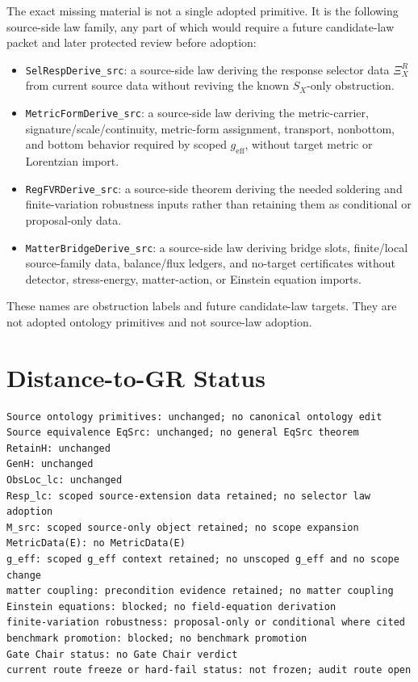 \documentclass[11pt]{article}
\newcommand{\geff}{g_{\mathrm{eff}}}
\begin{document}
The exact missing material is not a single adopted primitive. It is the
following source-side law family, any part of which would require a future
candidate-law packet and later protected review before adoption:

\begin{itemize}[leftmargin=*]
\item \texttt{SelRespDerive\_src}: a source-side law deriving the response
selector data \(\Xi_X^R\) from current source data without reviving the
known \(S_X\)-only obstruction.
\item \texttt{MetricFormDerive\_src}: a source-side law deriving the
metric-carrier, signature/scale/continuity, metric-form assignment, transport,
nonbottom, and bottom behavior required by scoped \(\geff\), without target
metric or Lorentzian import.
\item \texttt{RegFVRDerive\_src}: a source-side theorem deriving the needed
soldering and finite-variation robustness inputs rather than retaining them
as conditional or proposal-only data.
\item \texttt{MatterBridgeDerive\_src}: a source-side law deriving bridge
slots, finite/local source-family data, balance/flux ledgers, and no-target
certificates without detector, stress-energy, matter-action, or Einstein
equation imports.
\end{itemize}

These names are obstruction labels and future candidate-law targets. They are
not adopted ontology primitives and not source-law adoption.

\section{Distance-to-GR Status}

\begin{verbatim}
Source ontology primitives: unchanged; no canonical ontology edit
Source equivalence EqSrc: unchanged; no general EqSrc theorem
RetainH: unchanged
GenH: unchanged
ObsLoc_lc: unchanged
Resp_lc: scoped source-extension data retained; no selector law adoption
M_src: scoped source-only object retained; no scope expansion
MetricData(E): no MetricData(E)
g_eff: scoped g_eff context retained; no unscoped g_eff and no scope change
matter coupling: precondition evidence retained; no matter coupling
Einstein equations: blocked; no field-equation derivation
finite-variation robustness: proposal-only or conditional where cited
benchmark promotion: blocked; no benchmark promotion
Gate Chair status: no Gate Chair verdict
current route freeze or hard-fail status: not frozen; audit route open
\end{verbatim}
\end{document}
